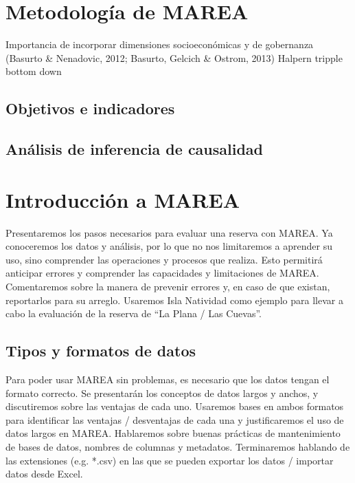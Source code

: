 \documentclass[]{krantz}
\begin{document}
\hypertarget{metodologia-de-marea}{%
\chapter{Metodología de MAREA}\label{metodologia-de-marea}}

Importancia de incorporar dimensiones socioeconómicas y de gobernanza
(Basurto \& Nenadovic, 2012; Basurto, Gelcich \& Ostrom, 2013) Halpern
tripple bottom down

\hypertarget{objetivos-e-indicadores}{%
\section{Objetivos e indicadores}\label{objetivos-e-indicadores}}

\hypertarget{analisis-de-inferencia-de-causalidad}{%
\section{Análisis de inferencia de
causalidad}\label{analisis-de-inferencia-de-causalidad}}

\hypertarget{introduccion-a-marea}{%
\chapter{Introducción a MAREA}\label{introduccion-a-marea}}

Presentaremos los pasos necesarios para evaluar una reserva con MAREA.
Ya conoceremos los datos y análisis, por lo que no nos limitaremos a
aprender su uso, sino comprender las operaciones y procesos que realiza.
Esto permitirá anticipar errores y comprender las capacidades y
limitaciones de MAREA. Comentaremos sobre la manera de prevenir errores
y, en caso de que existan, reportarlos para su arreglo. Usaremos Isla
Natividad como ejemplo para llevar a cabo la evaluación de la reserva de
``La Plana / Las Cuevas''.

\hypertarget{tipos-y-formatos-de-datos}{%
\section{Tipos y formatos de datos}\label{tipos-y-formatos-de-datos}}

Para poder usar MAREA sin problemas, es necesario que los datos tengan
el formato correcto. Se presentarán los conceptos de datos largos y
anchos, y discutiremos sobre las ventajas de cada uno. Usaremos bases en
ambos formatos para identificar las ventajas / desventajas de cada una y
justificaremos el uso de datos largos en MAREA. Hablaremos sobre buenas
prácticas de mantenimiento de bases de datos, nombres de columnas y
metadatos. Terminaremos hablando de las extensiones (e.g. *.csv) en las
que se pueden exportar los datos / importar datos desde Excel.
\end{document}
